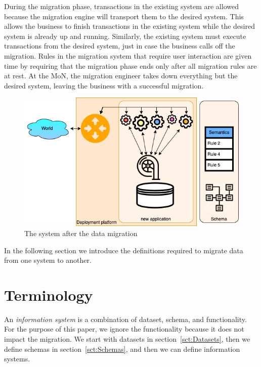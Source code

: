 \documentclass{elsarticle}
\begin{document}
   During the migration phase, transactions in the existing system are allowed because the migration engine will transport them to the desired system.
   This allows the business to finish transactions in the existing system while the desired system is already up and running.
   Similarly, the existing system must execute transactions from the desired system, just in case the business calls off the migration.
   Rules in the migration system that require user interaction are given time by requiring that the migration phase ends
   only after all migration rules are at rest.
   At the MoN, the migration engineer takes down everything but the desired system,
   leaving the business with a successful migration.
\begin{figure}[bht]
   \begin{center}
     \includegraphics[scale=.35]{datamigration-Post-migration.drawio.png}
   \end{center}
\caption{The system after the data migration}
\label{fig:post-migration}
\end{figure}

   In the following section we introduce the definitions required to migrate data from one system to another.

\section{Terminology}
\label{sct:Terminology}
   An {\em information system} is a combination of dataset, schema, and functionality.
   For the purpose of this paper, we ignore the functionality because it does not impact the migration.
   We start with datasets in section~\ref{sct:Datasets}, then we define schemas in section~\ref{sct:Schemas},
   and then we can define information systems.
\end{document}
